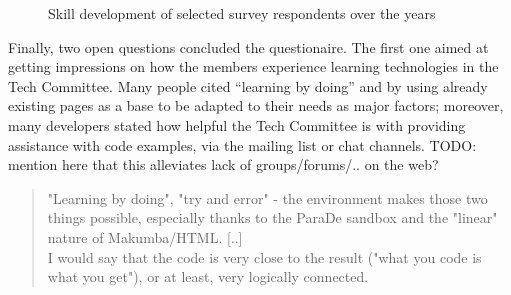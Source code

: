 \documentclass{acm_proc_article-sp}
\begin{document}
\begin{figure}
  \label{fig:learning-members}
  \caption{Skill development of selected survey respondents over the years}
\end{figure} 




Finally, two open questions concluded the questionaire. The first one aimed at getting impressions on how the members experience learning technologies in the Tech Committee. Many people cited ``learning by doing'' and by using already existing pages as a base to be adapted to their needs as major factors; moreover, many developers stated how helpful the Tech Committee is with providing assistance with code examples, via the mailing list or chat channels. TODO: mention here that this alleviates lack of groups/forums/.. on the web?



\begin{quotation}
 	"Learning by doing", "try and error" - the environment makes those two things possible, especially thanks to the ParaDe sandbox and the "linear" nature of Makumba/HTML. [..]\\
 	I would say that the code is very close to the result ("what you code is what you get"), or at least, very logically connected. 
\end{quotation}
\end{document}
